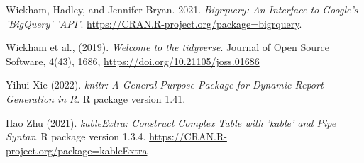 \documentclass[12pt,longbibliography]{article}
\theoremstyle{definition}
\theoremstyle{remark}
\begin{document}
\begin{thebibliography}{99}
Wickham, Hadley, and Jennifer Bryan. 2021. \textit{Bigrquery: An Interface to Google’s ’BigQuery’ ’API’}. \url{https://CRAN.R-project.org/package=bigrquery}.

   Wickham et al., (2019). \textit{Welcome to the tidyverse}. Journal of Open Source Software, 4(43), 1686, \url{https://doi.org/10.21105/joss.01686}

 Yihui Xie (2022). \textit{knitr: A General-Purpose Package for Dynamic Report Generation in R}. R package version 1.41.

 Hao Zhu (2021). \textit{kableExtra: Construct Complex Table with 'kable' and Pipe Syntax}. R package version 1.3.4. \url{https://CRAN.R-project.org/package=kableExtra}

\end{thebibliography} 


\newpage

\listoffigures

\newpage

\listoftables
\end{document}
